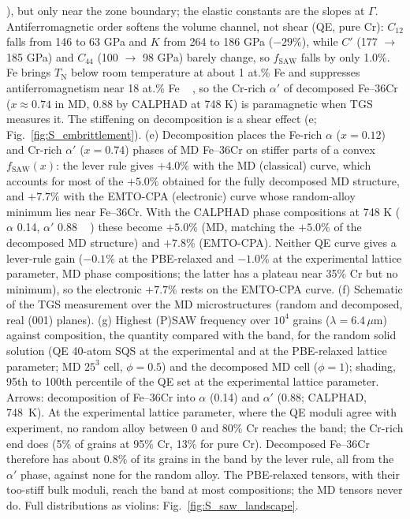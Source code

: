 \documentclass[final,3p,times]{elsarticle}
\begin{document}
{{\cite{shaw1971investigation}}\hskip0pt%
), but only near the zone boundary; the elastic constants are the slopes at $\Gamma$. Antiferromagnetic order softens the volume channel, not shear (QE, pure Cr): $C_{12}$ falls from 146 to 63 GPa and $K$ from 264 to 186 GPa ($-29\%$), while $C'$ (177 $\to$ 185 GPa) and $C_{44}$ (100 $\to$ 98 GPa) barely change, so $f_{\mathrm{SAW}}$ falls by only 1.0\%. Fe brings $T_{\mathrm N}$ below room temperature at about 1 at.\% Fe and suppresses antiferromagnetism near 18 at.\% Fe \mbox{%
\cite{xiong2011improved}}\hskip0pt%
, so the Cr-rich $\alpha'$ of decomposed Fe--36Cr ($x\approx0.74$ in MD, 0.88 by CALPHAD at 748 K) is paramagnetic when TGS measures it. The stiffening on decomposition is a shear effect (e; Fig.~\ref{fig:S_embrittlement}). (e) Decomposition places the Fe-rich $\alpha$ ($x=0.12$) and Cr-rich $\alpha'$ ($x=0.74$) phases of MD Fe--36Cr on stiffer parts of a convex $f_{\mathrm{SAW}}(x)$: the lever rule gives $+4.0\%$ with the MD (classical) curve, which accounts for most of the $+5.0\%$ obtained for the fully decomposed MD structure, and $+7.7\%$ with the EMTO-CPA (electronic) curve whose random-alloy minimum lies near Fe--36Cr. With the CALPHAD phase compositions at 748 K ($\alpha$ 0.14, $\alpha'$ 0.88 \mbox{%
\cite{xiong2011improved}}\hskip0pt%
) these become $+5.0\%$ (MD, matching the $+5.0\%$ of the decomposed MD structure) and $+7.8\%$ (EMTO-CPA). Neither QE curve gives a lever-rule gain ($-0.1\%$ at the PBE-relaxed and $-1.0\%$ at the experimental lattice parameter, MD phase compositions; the latter has a plateau near 35\% Cr but no minimum), so the electronic $+7.7\%$ rests on the EMTO-CPA curve. (f) Schematic of the TGS measurement over the MD microstructures (random and decomposed, real (001) planes). (g) Highest (P)SAW frequency over $10^4$ grains ($\lambda=6.4\,\mu$m) against composition, the quantity compared with the band, for the random solid solution (QE 40-atom SQS at the experimental and at the PBE-relaxed lattice parameter; MD $25^3$ cell, $\phi=0.5$) and the decomposed MD cell ($\phi=1$); shading, 95th to 100th percentile of the QE set at the experimental lattice parameter. Arrows: decomposition of Fe--36Cr into $\alpha$ (0.14) and $\alpha'$ (0.88; CALPHAD, 748~K). At the experimental lattice parameter, where the QE moduli agree with experiment, no random alloy between 0 and 80\% Cr reaches the band; the Cr-rich end does (5\% of grains at 95\% Cr, 13\% for pure Cr). Decomposed Fe--36Cr therefore has about 0.8\% of its grains in the band by the lever rule, all from the $\alpha'$ phase, against none for the random alloy. The PBE-relaxed tensors, with their too-stiff bulk moduli, reach the band at most compositions; the MD tensors never do. Full distributions as violins: Fig.~\ref{fig:S_saw_landscape}.
}\clearpage
\end{document}
